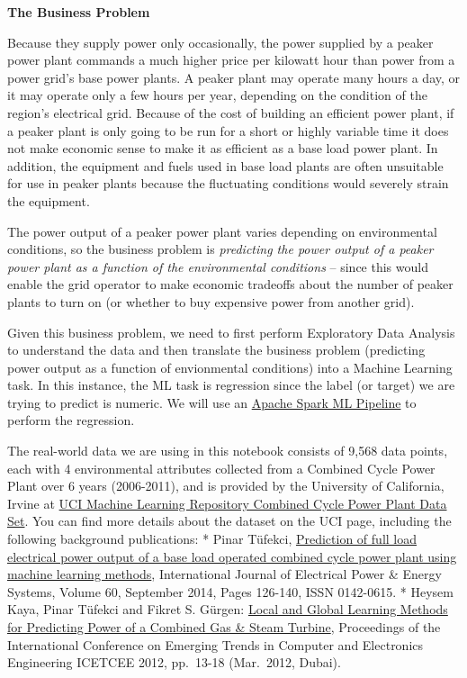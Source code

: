 \documentclass[11pt]{article}
\begin{document}
\textbf{The Business Problem}

Because they supply power only occasionally, the power supplied by a
peaker power plant commands a much higher price per kilowatt hour than
power from a power grid's base power plants. A peaker plant may operate
many hours a day, or it may operate only a few hours per year, depending
on the condition of the region's electrical grid. Because of the cost of
building an efficient power plant, if a peaker plant is only going to be
run for a short or highly variable time it does not make economic sense
to make it as efficient as a base load power plant. In addition, the
equipment and fuels used in base load plants are often unsuitable for
use in peaker plants because the fluctuating conditions would severely
strain the equipment.

The power output of a peaker power plant varies depending on
environmental conditions, so the business problem is \emph{predicting
the power output of a peaker power plant as a function of the
environmental conditions} -- since this would enable the grid operator
to make economic tradeoffs about the number of peaker plants to turn on
(or whether to buy expensive power from another grid).

Given this business problem, we need to first perform Exploratory Data
Analysis to understand the data and then translate the business problem
(predicting power output as a function of envionmental conditions) into
a Machine Learning task. In this instance, the ML task is regression
since the label (or target) we are trying to predict is numeric. We will
use an
\href{https://spark.apache.org/docs/latest/api/python/reference/pyspark.ml.html}{Apache
Spark ML Pipeline} to perform the regression.

The real-world data we are using in this notebook consists of 9,568 data
points, each with 4 environmental attributes collected from a Combined
Cycle Power Plant over 6 years (2006-2011), and is provided by the
University of California, Irvine at
\href{https://archive.ics.uci.edu/ml/datasets/Combined+Cycle+Power+Plant}{UCI
Machine Learning Repository Combined Cycle Power Plant Data Set}. You
can find more details about the dataset on the UCI page, including the
following background publications: * Pinar Tüfekci,
\href{https://www.sciencedirect.com/science/article/abs/pii/S0142061514000908}{Prediction
of full load electrical power output of a base load operated combined
cycle power plant using machine learning methods}, International Journal
of Electrical Power \& Energy Systems, Volume 60, September 2014, Pages
126-140, ISSN 0142-0615. * Heysem Kaya, Pinar Tüfekci and Fikret S.
Gürgen:
\href{https://www.researchgate.net/publication/269108474_Local_and_Global_Learning_Methods_for_Predicting_Power_of_a_Combined_Gas_Steam_Turbine}{Local
and Global Learning Methods for Predicting Power of a Combined Gas \&
Steam Turbine}, Proceedings of the International Conference on Emerging
Trends in Computer and Electronics Engineering ICETCEE 2012, pp.~13-18
(Mar.~2012, Dubai).
\end{document}
